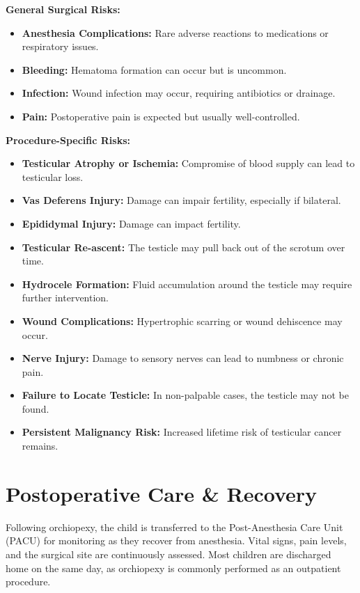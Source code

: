 \textbf{General Surgical Risks:}

\begin{itemize}
  \item \textbf{Anesthesia Complications:} Rare adverse reactions to medications or respiratory issues.
  \item \textbf{Bleeding:} Hematoma formation can occur but is uncommon.
  \item \textbf{Infection:} Wound infection may occur, requiring antibiotics or drainage.
  \item \textbf{Pain:} Postoperative pain is expected but usually well-controlled.
\end{itemize}

\textbf{Procedure-Specific Risks:}

\begin{itemize}
  \item \textbf{Testicular Atrophy or Ischemia:} Compromise of blood supply can lead to testicular loss.
  \item \textbf{Vas Deferens Injury:} Damage can impair fertility, especially if bilateral.
  \item \textbf{Epididymal Injury:} Damage can impact fertility.
  \item \textbf{Testicular Re-ascent:} The testicle may pull back out of the scrotum over time.
  \item \textbf{Hydrocele Formation:} Fluid accumulation around the testicle may require further intervention.
  \item \textbf{Wound Complications:} Hypertrophic scarring or wound dehiscence may occur.
  \item \textbf{Nerve Injury:} Damage to sensory nerves can lead to numbness or chronic pain.
  \item \textbf{Failure to Locate Testicle:} In non-palpable cases, the testicle may not be found.
  \item \textbf{Persistent Malignancy Risk:} Increased lifetime risk of testicular cancer remains.
\end{itemize}

\section*{Postoperative Care \& Recovery}
Following orchiopexy, the child is transferred to the Post-Anesthesia Care Unit (PACU) for monitoring as they recover from anesthesia. Vital signs, pain levels, and the surgical site are continuously assessed. Most children are discharged home on the same day, as orchiopexy is commonly performed as an outpatient procedure.

